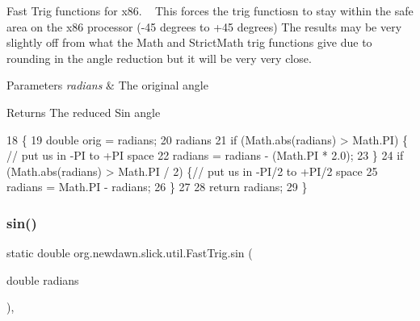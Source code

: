 Fast Trig functions for x86. ~\newline
This forces the trig functiosn to stay within the safe area on the x86 processor (-\/45 degrees to +45 degrees) The results may be very slightly off from what the Math and Strict\+Math trig functions give due to rounding in the angle reduction but it will be very very close.


\begin{DoxyParams}{Parameters}
{\em radians} & The original angle \\
\hline
\end{DoxyParams}
\begin{DoxyReturn}{Returns}
The reduced Sin angle 
\end{DoxyReturn}

\begin{DoxyCode}
18                                                          \{
19         \textcolor{keywordtype}{double} orig = radians;
20         radians %
21         \textcolor{keywordflow}{if} (Math.abs(radians) > Math.PI) \{ \textcolor{comment}{// put us in -PI to +PI space}
22             radians = radians - (Math.PI * 2.0);
23         \}
24         \textcolor{keywordflow}{if} (Math.abs(radians) > Math.PI / 2) \{\textcolor{comment}{// put us in -PI/2 to +PI/2 space}
25             radians = Math.PI - radians;
26         \}
27 
28         \textcolor{keywordflow}{return} radians;
29     \}
\end{DoxyCode}
\mbox{\label{classorg_1_1newdawn_1_1slick_1_1util_1_1_fast_trig_afb5f3af5e68974ea439119bd3eb365a5}} 
\subsubsection{\texorpdfstring{sin()}{sin()}}
{\footnotesize\ttfamily static double org.\+newdawn.\+slick.\+util.\+Fast\+Trig.\+sin (\begin{DoxyParamCaption}\item[{double}]{radians }\end{DoxyParamCaption})\hspace{0.3cm}{\ttfamily [inline]}, {\ttfamily [static]}}

